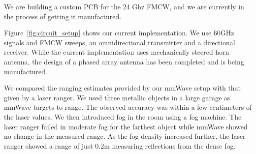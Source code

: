 We are building a custom PCB for the 24 Ghz FMCW, and we are currently in the process of getting it manufactured. 




Figure~\ref{fig:circuit_setup} shows our current implementation. We use 60GHz signals and FMCW sweeps, an omnidirectional transmitter and a directional receiver. While the current implementation uses mechanically steered horn antenna, the design of a phased array antenna has been completed and is being manufactured. 



We compared the ranging estimates provided by our mmWave setup with that given by a laser ranger. We used three metallic objects in a large garage as mmWave targets to range. The observed accuracy was within a few centimeters of the laser values. We then introduced fog in the room using a fog machine. The laser ranger failed in moderate fog for the farthest object while mmWave showed no change in the measured range. As the fog density increased further, the laser ranger showed a range of just 0.2m measuring reflections from the dense fog.   

\fi





	










